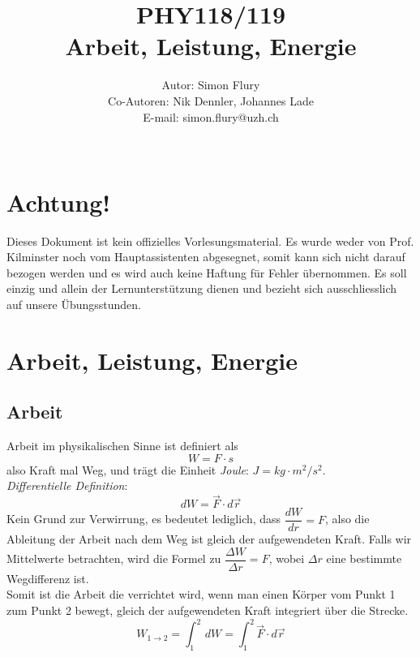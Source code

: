 \documentclass[12pt]{article}
\begin{document}
\title{PHY118/119 \\ {\bf Arbeit, Leistung, Energie}}
\author{Autor: Simon Flury \\ Co-Autoren: Nik Dennler, Johannes Lade \\ E-mail: simon.flury@uzh.ch \\\\ }
\maketitle

\section{Achtung!}
Dieses Dokument ist kein offizielles Vorlesungsmaterial. Es wurde weder von Prof. Kilminster noch vom Hauptassistenten abgesegnet, somit kann sich nicht darauf bezogen werden und es wird auch keine Haftung für Fehler übernommen. Es soll einzig und allein der Lernunterstützung dienen und bezieht sich ausschliesslich auf unsere Übungsstunden.
\section{Arbeit, Leistung, Energie}
\subsection*{Arbeit}
Arbeit im physikalischen Sinne ist definiert als 
\begin{equation}
W = F \cdot s
\end{equation}
also Kraft mal Weg, und trägt die Einheit \textit{Joule}: $J = kg\cdot m^2/s^2$.
\\
\textit{Differentielle Definition}:
\begin{equation}
dW = \vec{F} \cdot d\vec{r}
\end{equation}
Kein Grund zur Verwirrung, es bedeutet lediglich, dass $\dfrac{dW}{dr} = F$, also die Ableitung der Arbeit nach dem Weg ist gleich der aufgewendeten Kraft. Falls wir Mittelwerte betrachten, wird die Formel zu $\dfrac{\Delta W}{\Delta r} = F$, wobei $\Delta r$ eine bestimmte Wegdifferenz ist.\\ 
Somit ist die Arbeit die verrichtet wird, wenn man einen Körper vom Punkt 1 zum Punkt 2 bewegt, gleich der aufgewendeten Kraft integriert über die Strecke.
\begin{equation}
W_{1\rightarrow 2} = \int_{1}^2 \,dW = \int_{1}^2 \vec{F} \cdot d\vec{r}
\end{equation}
 
\end{document}
